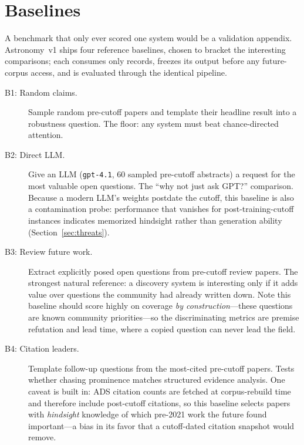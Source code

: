 \section{Baselines}
\label{sec:baselines}

A benchmark that only ever scored one system would be a validation
appendix. Astronomy~v1 ships four reference baselines, chosen to
bracket the interesting comparisons; each consumes only \corpusA{}
records, freezes its output before any future-corpus access, and is
evaluated through the identical pipeline.

\begin{description}
  \item[B1: Random claims.] Sample random pre-cutoff papers and template
    their headline result into a robustness question. The floor: any
    system must beat chance-directed attention.
  \item[B2: Direct LLM.] Give an LLM (\texttt{gpt-4.1}, 60 sampled
    pre-cutoff abstracts) a request for the most valuable open
    questions. The ``why not just ask GPT?'' comparison. Because a
    modern LLM's weights postdate the cutoff, this baseline is also a
    contamination probe: performance that vanishes for
    post-training-cutoff instances indicates memorized hindsight rather
    than generation ability (Section~\ref{sec:threats}).
  \item[B3: Review future work.] Extract explicitly posed open questions
    from pre-cutoff review papers. The strongest natural reference: a
    discovery system is interesting only if it adds value over questions
    the community had already written down. Note this baseline should
    score highly on coverage \emph{by construction}---these questions
    are known community priorities---so the discriminating metrics are
    premise refutation and lead time, where a copied question can never
    lead the field.
  \item[B4: Citation leaders.] Template follow-up questions from the
    most-cited pre-cutoff papers. Tests whether chasing prominence
    matches structured evidence analysis. One caveat is built in: ADS
    citation counts are fetched at corpus-rebuild time and therefore
    include post-cutoff citations, so this baseline selects papers with
    \emph{hindsight} knowledge of which pre-2021 work the future found
    important---a bias in its favor that a cutoff-dated citation
    snapshot would remove.
\end{description}

